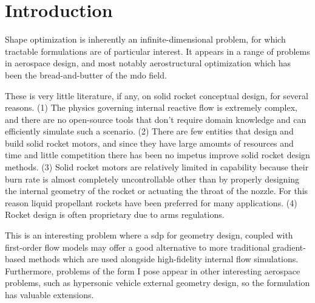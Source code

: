     \section{Introduction}

    Shape optimization is inherently an infinite-dimensional problem,
    for which tractable formulations are of particular interest.
    It appears in a range of problems in aerospace design, and most notably
    aerostructural optimization which has been the bread-and-butter of the \gls{mdo} field.

    These is very little literature, if any, on solid rocket conceptual design,
    for several reasons. (1) The physics governing internal reactive flow is extremely complex,
    and there are no open-source tools that don't require domain knowledge and
    can efficiently simulate such a scenario.
    (2) There are few entities that design and build solid rocket motors, and since they have
    large amounts of resources and time and little competition there has been no impetus
    improve solid rocket design methods. (3) Solid rocket motors are relatively limited
    in capability because their burn rate is almost completely uncontrollable other
    than by properly designing the internal geometry of the rocket or actuating the
    throat of the nozzle. For this reason liquid propellant rockets have been preferred for
    many applications. (4) Rocket design is often proprietary due to arms regulations.

    This is an interesting problem where a \gls{sdp} for geometry design,
    coupled with first-order flow models may offer a good alternative to
    more traditional gradient-based methods which are used alongside
    high-fidelity internal flow simulations.
    Furthermore, problems of the form I pose appear in other interesting
    aerospace problems, such as hypersonic vehicle external geometry design,
    so the formulation has valuable extensions.
